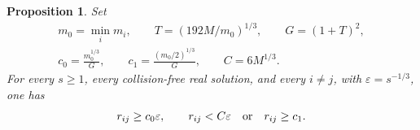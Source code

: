 \documentclass[11pt,a4paper]{amsart}
\newtheorem{proposition}[theorem]{Proposition}
\numberwithin{equation}{section}
\newcommand{\eps}{\varepsilon}
\begin{document}
\begin{proposition}\label{prop:scales}
Set
\begin{equation}\label{eq:scale-constants}
 \begin{gathered}
 m_0=\min_i m_i,\qquad T=(192M/m_0)^{1/3},\qquad G=(1+T)^2,\\
 c_0=\frac{m_0^{1/3}}G,\qquad
 c_1=\frac{(m_0/2)^{1/3}}G,\qquad C=6M^{1/3}.
 \end{gathered}
\end{equation}
For every $s\ge1$, every collision-free real solution, and every
$i\ne j$, with $\eps=s^{-1/3}$, one has
\begin{equation}\label{eq:scales}
 r_{ij}\ge c_0\eps,\qquad
 r_{ij}<C\eps\quad\hbox{or}\quad r_{ij}\ge c_1.
\end{equation}
\end{proposition}
\end{document}
